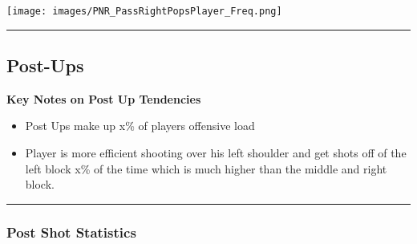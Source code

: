\documentclass[a4paper,12pt]{article}
\begin{document}
\begin{table}[H]
{\begin{minipage}[t]{0.6\textwidth}
{\begin{tabular}
{{{{{{{{{{{{            \bottomrule
        \end{tabular}
        } %
    \end{minipage}
    } %
    \hfill %
    \begin{minipage}[c]{0.35\textwidth} %
        \flushright
        \texttt{[image: images/PNR\_PassRightPopsPlayer\_Freq.png]} %
    \end{minipage}
\end{table}

\vspace{-1em} %
\hrule height 1pt width 1\textwidth %
\vspace{1em} %

\clearpage

\subsection{Post-Ups}

\vspace{1.25em} %
\textbf{Key Notes on Post Up Tendencies}
\vspace{0.5em} %

\begin{itemize}
    \item Post Ups make up x\% of players offensive load
    \vspace{0.3em} %
    \item Player is more efficient shooting over his left shoulder and get shots off of the left block x\% of the time which is much higher than the middle and right block.
\end{itemize}

\vspace{1em} %
\hrule height 1pt width 1\textwidth %
\vspace{0em} %

\subsubsection{Post Shot Statistics}
\end{document}
